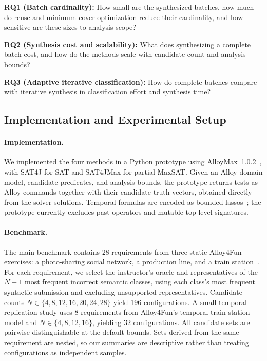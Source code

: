 \documentclass[runningheads]{llncs}
\begin{document}
\textbf{RQ1 (Batch cardinality):} How small are the synthesized batches, how
much do reuse and minimum-cover optimization reduce their cardinality, and how
sensitive are these sizes to analysis scope?

\textbf{RQ2 (Synthesis cost and scalability):} What does synthesizing a complete
batch cost, and how do the methods scale with candidate count and analysis
bounds?

\textbf{RQ3 (Adaptive iterative classification):} How do complete batches
compare with iterative synthesis in classification effort and synthesis time?

\subsection{Implementation and Experimental Setup}
\label{sec:implementation}

\paragraph{Implementation.}
We implemented the four methods in a Python prototype using
AlloyMax~1.0.2~\cite{zhang2021alloymax}, with SAT4J for SAT and SAT4JMax for
partial MaxSAT. Given an Alloy domain model, candidate predicates, and analysis
bounds, the prototype returns tests as Alloy commands together with their
candidate truth vectors, obtained directly from the solver solutions.
Temporal formulas are encoded as bounded
lassos~\cite{biere1999symbolic}; the prototype currently excludes past operators
and mutable top-level signatures.

\paragraph{Benchmark.}
The main benchmark contains 28 requirements from three static Alloy4Fun
exercises: a photo-sharing social network, a production line, and a train
station~\cite{macedo2021experiences,alloy4fun_dataset,a4f_semantic_dataset}. For
each requirement, we select the instructor's oracle and representatives of the
$N-1$ most frequent incorrect semantic classes, using each class's most
frequent syntactic submission and excluding unsupported representatives.
Candidate counts $N\in\{4,8,12,16,20,24,28\}$ yield 196 configurations. A small
temporal replication study uses 8 requirements from Alloy4Fun's temporal
train-station model and $N\in\{4,8,12,16\}$, yielding 32 configurations. All
candidate sets are pairwise distinguishable at the default bounds. Sets
derived from the same requirement are nested, so our summaries are descriptive
rather than treating configurations as independent samples.
\end{document}
